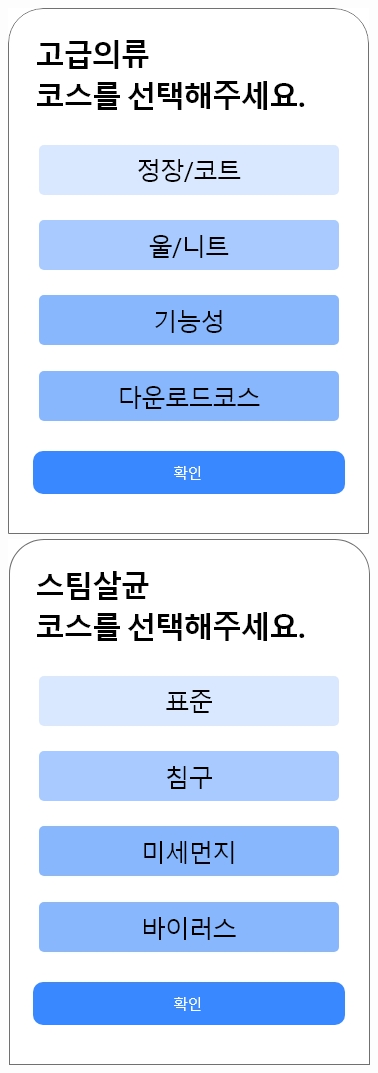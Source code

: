 \documentclass[conference]{IEEEtran}
\begin{document}
\begin{enumerate}
\centerline{\includegraphics[scale=0.3]{고급의류 선택.jpg}
            \includegraphics[scale=0.3]{스팀살균 선택.jpg}} \\ \\

\end{enumerate}
\end{document}
